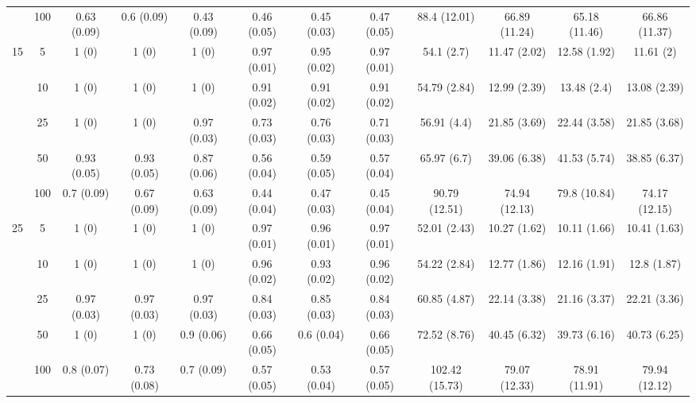 \documentclass[11pt]{article}
\theoremstyle{definition}
\begin{document}
\begin{table}[H]
\begin{center}
{\begin{tabular}{cc|ccc|ccc|cccc|}
    & 100  & 0.63 (0.09) & 0.6 (0.09) & 0.43 (0.09) & 0.46 (0.05) & 0.45 (0.03) & 0.47 (0.05) & 88.4 (12.01) & 66.89 (11.24) & 65.18 (11.46) & 66.86 (11.37)\\[.3cm]
   \multirow{5}{*}{15}  & 5  & 1 (0) & 1 (0) & 1 (0) & 0.97 (0.01) & 0.95 (0.02) & 0.97 (0.01) & 54.1 (2.7) & 11.47 (2.02) & 12.58 (1.92) & 11.61 (2) \\ 
    & 10  & 1 (0) & 1 (0) & 1 (0) & 0.91 (0.02) & 0.91 (0.02) & 0.91 (0.02) & 54.79 (2.84) & 12.99 (2.39) & 13.48 (2.4) & 13.08 (2.39) \\ 
    & 25  & 1 (0) & 1 (0) & 0.97 (0.03) & 0.73 (0.03) & 0.76 (0.03) & 0.71 (0.03) & 56.91 (4.4) & 21.85 (3.69) & 22.44 (3.58) & 21.85 (3.68) \\ 
    & 50  & 0.93 (0.05) & 0.93 (0.05) & 0.87 (0.06) & 0.56 (0.04) & 0.59 (0.05) & 0.57 (0.04) & 65.97 (6.7) & 39.06 (6.38) & 41.53 (5.74) & 38.85 (6.37) \\ 
    & 100  & 0.7 (0.09) & 0.67 (0.09) & 0.63 (0.09) & 0.44 (0.04) & 0.47 (0.03) & 0.45 (0.04) & 90.79 (12.51) & 74.94 (12.13) & 79.8 (10.84) & 74.17 (12.15) \\[.3cm]
   \multirow{5}{*}{25}  & 5  & 1 (0) & 1 (0) & 1 (0) & 0.97 (0.01) & 0.96 (0.01) & 0.97 (0.01) & 52.01 (2.43) & 10.27 (1.62) & 10.11 (1.66) & 10.41 (1.63) \\ 
   & 10  & 1 (0) & 1 (0) & 1 (0) & 0.96 (0.02) & 0.93 (0.02) & 0.96 (0.02) & 54.22 (2.84) & 12.77 (1.86) & 12.16 (1.91) & 12.8 (1.87) \\ 
    & 25  & 0.97 (0.03) & 0.97 (0.03) & 0.97 (0.03) & 0.84 (0.03) & 0.85 (0.03) & 0.84 (0.03) & 60.85 (4.87) & 22.14 (3.38) & 21.16 (3.37) & 22.21 (3.36) \\ 
    & 50  & 1 (0) & 1 (0) & 0.9 (0.06) & 0.66 (0.05) & 0.6 (0.04) & 0.66 (0.05) & 72.52 (8.76) & 40.45 (6.32) & 39.73 (6.16) & 40.73 (6.25) \\ 
    & 100  & 0.8 (0.07) & 0.73 (0.08) & 0.7 (0.09) & 0.57 (0.05) & 0.53 (0.04) & 0.57 (0.05) & 102.42 (15.73) & 79.07 (12.33) & 78.91 (11.91) & 79.94 (12.12) \\ 
\end{tabular}}
   \end{center}
      \vspace{-.5cm}
\end{table}
\end{document}
